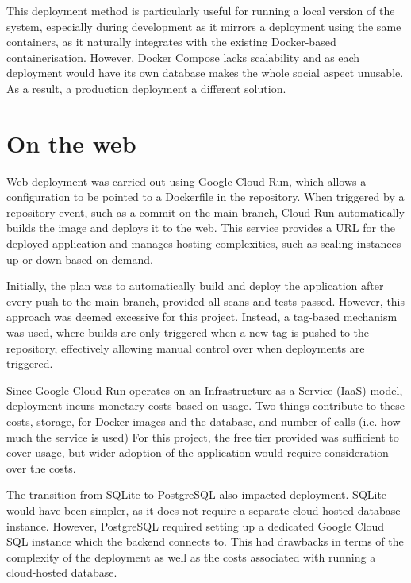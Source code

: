 This deployment method is particularly useful for running a local version of the system, especially during development as it mirrors a deployment using the same containers, as it naturally integrates with the existing Docker-based containerisation. However, Docker Compose lacks scalability and as each deployment would have its own database makes the whole social aspect unusable. As a result, a production deployment a different solution.

\section{On the web}
Web deployment was carried out using Google Cloud Run, which allows a configuration to be pointed to a Dockerfile in the repository. When triggered by a repository event, such as a commit on the main branch, Cloud Run automatically builds the image and deploys it to the web. This service provides a URL for the deployed application and manages hosting complexities, such as scaling instances up or down based on demand.

Initially, the plan was to automatically build and deploy the application after every push to the main branch, provided all scans and tests passed. However, this approach was deemed excessive for this project. Instead, a tag-based mechanism was used, where builds are only triggered when a new tag is pushed to the repository, effectively allowing manual control over when deployments are triggered.

Since Google Cloud Run operates on an Infrastructure as a Service (IaaS) model, deployment incurs monetary costs based on usage. Two things contribute to these costs, storage, for Docker images and the database, and number of calls (i.e. how much the service is used) For this project, the free tier provided was sufficient to cover usage, but wider adoption of the application would require consideration over the costs.

The transition from SQLite to PostgreSQL also impacted deployment. SQLite would have been simpler, as it does not require a separate cloud-hosted database instance. However, PostgreSQL required setting up a dedicated Google Cloud SQL instance which the backend connects to. This had drawbacks in terms of the complexity of the deployment as well as the costs associated with running a cloud-hosted database.
